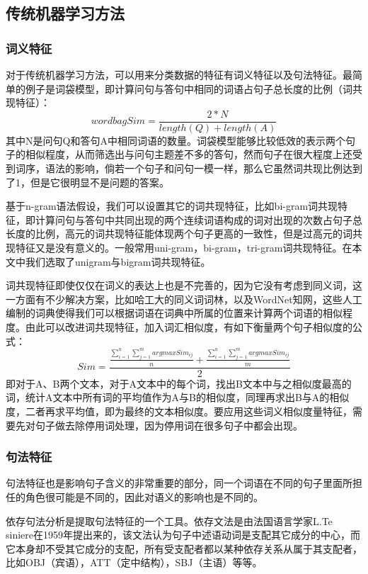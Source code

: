 \documentclass[UTF8]{ctexart}
\begin{document}
\subsection{传统机器学习方法}
\subsubsection{词义特征}
对于传统机器学习方法，可以用来分类数据的特征有词义特征以及句法特征。最简单的例子是词袋模型，即计算问句与答句中相同的词语占句子总长度的比例（词共现特征）：$$wordbagSim=\frac{2*N}{length(Q)+length(A)}$$其中N是问句Q和答句A中相同词语的数量。词袋模型能够比较低效的表示两个句子的相似程度，从而筛选出与问句主题差不多的答句，然而句子在很大程度上还受到词序，语法的影响，倘若一个句子和问句一模一样，那么它虽然词共现比例达到了1，但是它很明显不是问题的答案。

基于n-gram语法假设，我们可以设置其它的词共现特征，比如bi-gram词共现特征，即计算问句与答句中共同出现的两个连续词语构成的词对出现的次数占句子总长度的比例，高元的词共现特征能体现两个句子更高的一致性，但是过高元的词共现特征又是没有意义的。一般常用uni-gram，bi-gram，tri-gram词共现特征。在本文中我们选取了unigram与bigram词共现特征。

词共现特征即使仅仅在词义的表达上也是不完善的，因为它没有考虑到同义词，这一方面有不少解决方案，比如哈工大的同义词词林，以及WordNet知网，这些人工编制的词典使得我们可以根据词语在词典中所属的位置来计算两个词语的相似程度。由此可以改进词共现特征，加入词汇相似度，有如下衡量两个句子相似度的公式：$$Sim =\frac{\frac{\sum^n_{i=1}\sum_{j=1}^m argmax Sim_{ij}}{n}+\frac{\sum^n_{i=1}\sum_{j=1}^m argmax Sim_{ij}}{m}}{2}$$
即对于A、B两个文本，对于A文本中的每个词，找出B文本中与之相似度最高的词，统计A文本中所有词的平均值作为A与B的相似度，同理再求出B与A的相似度，二者再求平均值，即为最终的文本相似度。要应用这些词义相似度量特征，需要先对句子做去除停用词处理，因为停用词在很多句子中都会出现。%
\subsubsection{句法特征}
句法特征也是影响句子含义的非常重要的部分，同一个词语在不同的句子里面所担任的角色很可能是不同的，因此对语义的影响也是不同的。

依存句法分析是提取句法特征的一个工具。依存文法是由法国语言学家L.Te\\siniere在1959年提出来的，该文法认为句子中述语动词是支配其它成分的中心，而它本身却不受其它成分的支配，所有受支配者都以某种依存关系从属于其支配者，比如OBJ（宾语），ATT（定中结构），SBJ（主语）等等。%
\end{document}
